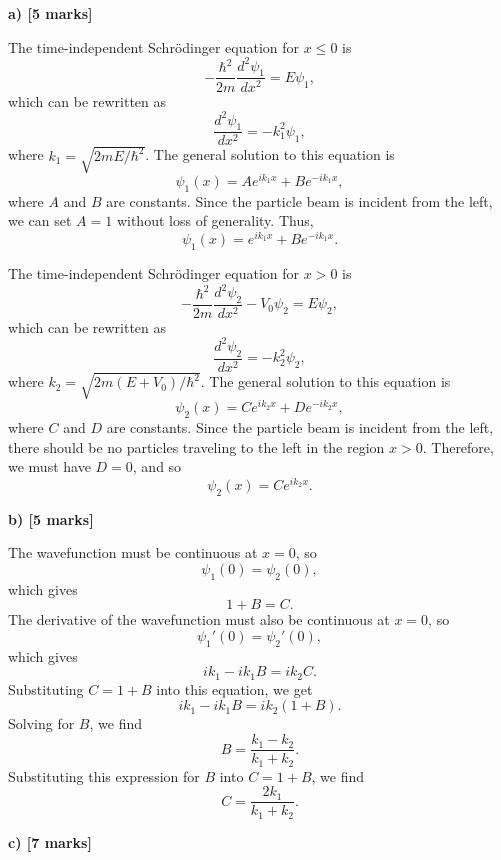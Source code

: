 \documentclass{article}
\begin{document}
\textbf{a) [5 marks]} 

The time-independent Schrödinger equation for $x \leq 0$ is
\[
-\frac{\hbar^2}{2m} \frac{d^2 \psi_1}{dx^2} = E \psi_1,
\]
which can be rewritten as
\[
\frac{d^2 \psi_1}{dx^2} = -k_1^2 \psi_1,
\]
where $k_1 = \sqrt{2mE/\hbar^2}$. The general solution to this equation is
\[
\psi_1(x) = Ae^{ik_1x} + Be^{-ik_1x},
\]
where $A$ and $B$ are constants. Since the particle beam is incident from the left, we can set $A=1$ without loss of generality. Thus,
\[
\psi_1(x) = e^{ik_1x} + Be^{-ik_1x}.
\]

The time-independent Schrödinger equation for $x > 0$ is
\[
-\frac{\hbar^2}{2m} \frac{d^2 \psi_2}{dx^2} - V_0 \psi_2 = E \psi_2,
\]
which can be rewritten as
\[
\frac{d^2 \psi_2}{dx^2} = -k_2^2 \psi_2,
\]
where $k_2 = \sqrt{2m(E+V_0)/\hbar^2}$. The general solution to this equation is
\[
\psi_2(x) = Ce^{ik_2x} + De^{-ik_2x},
\]
where $C$ and $D$ are constants. Since the particle beam is incident from the left, there should be no particles traveling to the left in the region $x > 0$. Therefore, we must have $D=0$, and so
\[
\psi_2(x) = Ce^{ik_2x}.
\]


\textbf{b) [5 marks]}

The wavefunction must be continuous at $x=0$, so
\[
\psi_1(0) = \psi_2(0),
\]
which gives
\[
1 + B = C.
\]
The derivative of the wavefunction must also be continuous at $x=0$, so
\[
\psi_1'(0) = \psi_2'(0),
\]
which gives
\[
ik_1 - ik_1B = ik_2C.
\]
Substituting $C = 1+B$ into this equation, we get
\[
ik_1 - ik_1B = ik_2(1+B).
\]
Solving for $B$, we find
\[
B = \frac{k_1 - k_2}{k_1 + k_2}.
\]
Substituting this expression for $B$ into $C = 1+B$, we find
\[
C = \frac{2k_1}{k_1 + k_2}.
\]


\textbf{c) [7 marks]}
\end{document}
